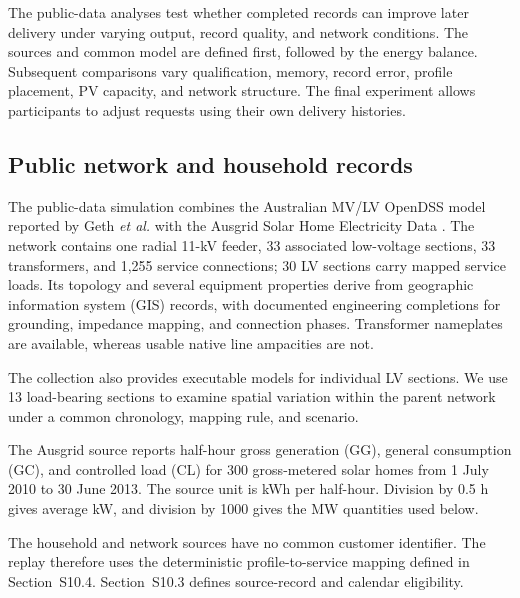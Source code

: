 \documentclass[11pt]{article}
\begin{document}
The public-data analyses test whether completed records can improve later
delivery under varying output, record quality, and network conditions. The
sources and common model are defined first, followed by the energy balance.
Subsequent comparisons vary qualification, memory, record error, profile
placement, PV capacity, and network structure. The final experiment allows
participants to adjust requests using their own delivery histories.

\subsection{Public network and household records}
\label{supp:au_sources}

The public-data simulation combines the Australian MV/LV OpenDSS model reported by
Geth \emph{et al.} \cite{geth2025australianfeeder} with the Ausgrid Solar Home
Electricity Data \cite{ausgrid2014solarhomes}. The network contains one radial
11-kV feeder, 33 associated low-voltage sections, 33 transformers, and 1,255
service connections; 30 LV sections carry mapped service loads. Its topology
and several equipment properties derive from geographic information system
(GIS) records, with documented engineering completions for grounding, impedance
mapping, and connection phases. Transformer nameplates are available, whereas
usable native line ampacities are not.

The collection also provides executable models for individual LV sections. We
use 13 load-bearing sections to examine spatial variation within the parent
network under a common chronology, mapping rule, and scenario.

The Ausgrid source reports half-hour gross generation (GG), general consumption
(GC), and controlled load (CL) for 300 gross-metered solar homes from 1 July
2010 to 30 June 2013. The source unit is kWh per half-hour. Division by 0.5 h
gives average kW, and division by 1000 gives the MW quantities used below.

The household and network sources have no common customer identifier. The replay
therefore uses the deterministic profile-to-service mapping defined in
Section~S10.4. Section~S10.3 defines source-record and calendar eligibility.
\end{document}
